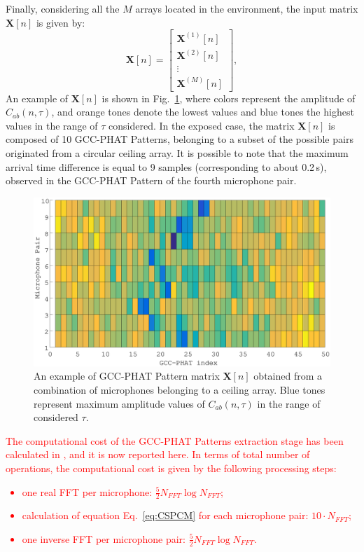 \documentclass[review]{elsarticle}
\newcommand{\figref}[1]{Fig.~\ref{#1}}
\let\originaleqref=\eqref
\renewcommand{\eqref}{Eq.~\originaleqref}
\begin{document}
Finally, considering all the $M$ arrays located in the environment, the input matrix $\mathbf{X}[n]$ is given by:
\begin{equation}\label{eq:fx_matrix}
\mathbf{X}[n] =   \begin{bmatrix} \mathbf{X}^{(1)}[n] \\ \mathbf{X}^{(2)}[n] \\ \vdots\\ \mathbf{X}^{(M)}[n] \end{bmatrix},
\end{equation}
An example of $\mathbf{X}[n]$ is shown in \figref{fig:GCC-PATT}, where colors represent the amplitude of $C_{ab}(n,\tau)$, and orange tones denote the lowest values and blue tones the highest values in the range of $\tau$ considered. In the exposed case, the matrix $\mathbf{X}[n]$ is composed of 10 GCC-PHAT Patterns, belonging to a subset of the possible pairs originated from a circular ceiling array. It is possible to note that the maximum arrival time difference is equal to 9 samples (corresponding to about 0.2\,s), observed in the GCC-PHAT Pattern of the fourth microphone pair.

\begin{figure}[h]
	\centering
	\includegraphics[width=0.9\columnwidth]{imgs/GCC-PHAT-PATTERN}
	\caption{An example of GCC-PHAT Pattern matrix $\mathbf{X}[n]$ obtained from a combination of microphones belonging to a ceiling array. Blue tones represent maximum amplitude values of $C_{ab}(n,\tau)$ in the range of considered $\tau$.}
	\label{fig:GCC-PATT}
\end{figure}


\textcolor{red}{The computational cost of the GCC-PHAT Patterns extraction stage has been calculated in \cite{DoSY07}, and it is now reported here. In terms of total number of operations, the computational cost is given by the following processing steps:
\begin{itemize}
\item one real FFT per microphone: $\frac{5}{2} N_{FFT} \log N_{FFT}$;
\item calculation of equation \eqref{eq:CSPCM} for each microphone pair: $10\cdot N_{FFT}$;
\item one inverse FFT per microphone pair:  $ \frac{5}{2} N_{FFT} \log N_{FFT}$.
\end{itemize}}
\end{document}
